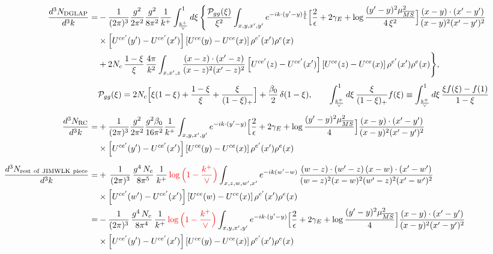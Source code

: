\documentclass[9pt]{article}
\numberwithin{equation}{section}
\newcommand{\chg}[1]{{\color{red}#1}}
\begin{document}
\begin{align}
\frac{d^{3}N_{\rm DGLAP}}{d^{3}k}= &-\frac{1}{(2\pi)^{3}}\frac{g^{2}}{2\pi^{2}}\frac{g^{2}}{8\pi^{2}}\frac{1}{k^{+}}\int_{\frac{k^{+}}{\vee}}^{1}d\xi\,\Bigg\{\frac{\mathcal P_{gg}(\xi)}{\xi^{2}}\int_{x,y,x',y'}e^{-ik\cdot(y'-y)\frac{1}{\xi}}\Big[\frac{2}{\epsilon}+2\gamma_{E}+\log\frac{(y'-y)^{2}\mu^{2}_{\overline{MS}}}{4\,\xi^{2}}\Big]\frac{(x-y)\cdot(x'-y')}{(x-y)^{2}(x'-y')^{2}}\notag\\
&\times\left[U^{ce'}(y') - U^{ce'}(x')\right]\left[U^{ce}(y) - U^{ce}(x)\right]\rho^{e'}(x')\rho^{e}(x)\notag\\
&+2N_{c}\,\frac{1-\xi}{\xi}\,\frac{4\pi}{k^{2}}\int_{x,x',z}\frac{(x-z)\cdot(x'-z)}{(x-z)^{2}(x'-z)^{2}}\left[U^{ce'}(z) - U^{ce'}(x')\right]\left[U^{ce}(z) - U^{ce}(x)\right]\rho^{e'}(x')\rho^{e}(x)\Bigg\},\\[4pt]
&\mathcal P_{gg}(\xi)=2N_{c}\Big[\xi(1-\xi)+\frac{1-\xi}{\xi}+\frac{\xi}{(1-\xi)_{+}}\Big]+\frac{\beta_{0}}{2}\,\delta(1-\xi),\qquad
\int_{\frac{k^{+}}{\vee}}^{1}d\xi\,\frac{\xi}{(1-\xi)_{+}}f(\xi)\equiv\int_{\frac{k^{+}}{\vee}}^{1}d\xi\,\frac{\xi f(\xi)-f(1)}{1-\xi}\notag\\[6pt]
\frac{d^{3}N_{\rm RC}}{d^{3}k}= & +\frac{1}{(2\pi)^{3}}\frac{g^{2}}{2\pi^{2}}\frac{g^{2}\beta_{0}}{16\pi^{2}}\frac{1}{k^{+}}\int_{x,y,x',y'}e^{-ik\cdot(y'-y)}\Big[\frac{2}{\epsilon}+2\gamma_{E}+\log\frac{(y'-y)^{2}\mu^{2}_{\overline{MS}}}{4}\Big]\frac{(x-y)\cdot(x'-y')}{(x-y)^{2}(x'-y')^{2}}\notag\\
&\times\left[U^{ce'}(y') - U^{ce'}(x')\right]\left[U^{ce}(y) - U^{ce}(x)\right]\rho^{e'}(x')\rho^{e}(x)\\[6pt]
\frac{d^{3}N_{\rm rest\ of\ JIMWLK\ piece}}{d^{3}k}= & +\,\frac{1}{(2\pi)^{3}}\,\frac{g^{4}\,N_{c}}{8\pi^{5}}\,\frac{1}{k^{+}}\,\chg{\log\Big(1-\frac{k^{+}}{\vee}\Big)}\int_{x,z,w,w',x'}e^{-ik(w'-w)}\,\frac{(w-z)\cdot (w'-z)\,(x-w)\cdot (x'-w')}{(w-z)^{2}(x-w)^{2}(w'-z)^{2}(x'-w')^{2}}\notag\\
&\times\left[U^{ce'}(w') - U^{ce'}(x')\right]\left[U^{ce}(w) - U^{ce}(x)\right]\rho^{e'}(x') \rho^{e}(x)\notag \\
= & -\frac{1}{(2\pi)^{3}}\,\frac{g^{4}\,N_{c}}{8\pi^{4}}\,\frac{1}{k^{+}}\,\chg{\log\Big(1-\frac{k^{+}}{\vee}\Big)}\int_{x,y,x',y'}e^{-ik\cdot(y'-y)}\Big[\frac{2}{\epsilon}+2\gamma_{E}+\log\frac{(y'-y)^{2}\mu^{2}_{\overline{MS}}}{4}\Big]\frac{(x-y)\cdot(x'-y')}{(x-y)^{2}(x'-y')^{2}}\notag\\
&\times\left[U^{ce'}(y') - U^{ce'}(x')\right]\left[U^{ce}(y) - U^{ce}(x)\right]\rho^{e'}(x')\rho^{e}(x)\\[6pt]

\end{align}
\end{document}

